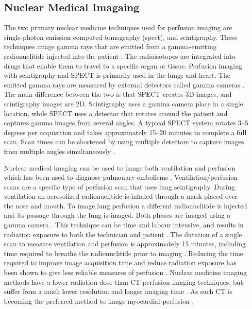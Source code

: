 \subsection{Nuclear Medical Imagaing}
The two primary nuclear medicine techniques used for perfusion imaging are 
single-photon emission computed tomography (\acrshort{spect}), and scintigraphy. 
These techniques image gamma rays that are emitted from a gamma-emitting radionuclitide
injected into the patient \parencite{mettler_essentials_2006}. 
The radioisotopes are integrated into drugs 
that enable them to travel to a specific organ or tissue. 
Perfusion imaging with scintigraphy and SPECT 
is primarily used in the lungs and heart. 
The emitted gamma rays are measured by external detectors called 
gamma cameras \parencite{mettler_essentials_2006}. 
The main difference between the two is that SPECT creates 3D images, and 
scintigraphy images are 2D.
Scintigraphy uses a gamma camera place in a single location, while SPECT 
uses a detector that rotates around the patient and captures gamma images from 
several angles. A typical SPECT system rotates 3--5 degrees per acquisition 
and takes approximately 15--20 minutes to complete a full scan. 
Scan times can be shortened by using
multiple detectors to capture
images from multiple angles simultaneously \parencite{mettler_essentials_2006}.

Nuclear medical imaging can be used to image both ventilation and perfusion which 
has been used to diagnose pulmonary embolisms \parencite{mortensen_lung_2019}.
Ventilation/perfusion scans are a specific type of perfusion scan that uses lung
scintigraphy. During ventilation an aerosolized radionuclitide is inhaled through a mask placed
over the nose and mouth. To image lung perfusion a different radionuclitide 
is injected and its passage through 
the lung is imaged.
Both phases are imaged using a gamma camera \parencite{mortensen_lung_2019}. 
This technique can be time and labour intensive, and results in 
radiation exposure to both the technician and patient \parencite{gandev_comparison_2005}.
The duration of a single scan to measure ventilation and  
perfusion is approximately 15 minutes, including time required to breathe the radionuclitide
prior to imaging \parencite{hur_optimizing_2014}. Reducing the time 
required to improve image acquisition time and reduce radiation exposure
has been shown to give less reliable measures of perfusion \parencite{hur_optimizing_2014}.
Nuclear medicine imaging methods have a lower radiation dose than CT perfusion imaging techniques,
but suffer from a much lower resolution and longer imaging time \parencite{aljizeeri_ct_2013}. 
As such CT is becoming the preferred 
method to image myocardial perfusion \parencite{aljizeeri_ct_2013}. 

